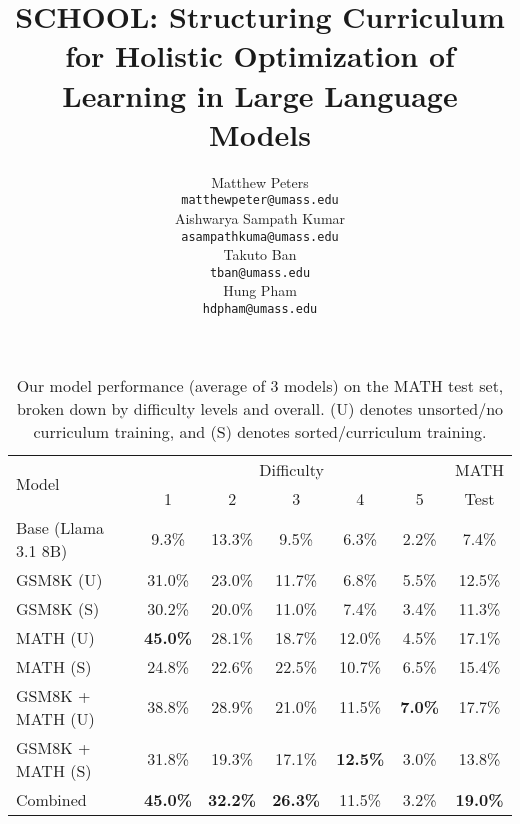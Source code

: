 \documentclass[11pt,a4paper]{article}
\title{SCHOOL: Structuring Curriculum for Holistic Optimization of Learning in Large Language Models}
\author{Matthew Peters \\
  {\tt matthewpeter@umass.edu} \\\And
  Aishwarya Sampath Kumar \\
  {\tt asampathkuma@umass.edu} \\\AND
  Takuto Ban \\
  {\tt tban@umass.edu} \\
  \And
  Hung Pham \\
  {\tt hdpham@umass.edu} \\
}
\date{}
\begin{document}
\maketitle





\begin{table*}[t]
    \centering
    \begin{tabular}{lcccccc}
    \toprule
    \multirow{2}{*}{Model} & \multicolumn{5}{c}{Difficulty} & MATH\\
         & 1 & 2 & 3 & 4 & 5 & Test \\\midrule
        Base (Llama 3.1 8B) & 9.3\% & 13.3\% & 9.5\% & 6.3\% & 2.2\% & 7.4\% \\
        GSM8K (U)           & 31.0\% & 23.0\% & 11.7\% & 6.8\% & 5.5\% & 12.5\% \\
        GSM8K (S)           & 30.2\% & 20.0\% & 11.0\% & 7.4\% & 3.4\% & 11.3\% \\
        MATH (U)            & \textbf{45.0\%} & 28.1\% & 18.7\% & 12.0\% & 4.5\% & 17.1\% \\
        MATH (S)            & 24.8\% & 22.6\% & 22.5\% & 10.7\% & 6.5\% & 15.4\% \\
        GSM8K + MATH (U)    & 38.8\% & 28.9\% & 21.0\% & 11.5\% & \textbf{7.0\%} & 17.7\% \\
        GSM8K + MATH (S)    & 31.8\% & 19.3\% & 17.1\% & \textbf{12.5\%} & 3.0\% & 13.8\% \\
        Combined            & \textbf{45.0\%} & \textbf{32.2\%} & \textbf{26.3\%} & 11.5\% & 3.2\% & \textbf{19.0\%} \\
        \bottomrule
    \end{tabular}
    \caption{Our model performance (average of 3 models) on the MATH test set, broken down by difficulty levels and overall. (U) denotes unsorted/no curriculum training, and (S) denotes sorted/curriculum training.}
    \label{tab:math_inference}
\end{table*}







\footnotesize

\end{document}
